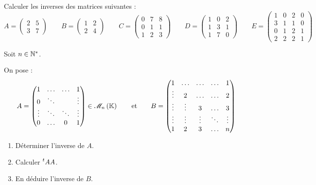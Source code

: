 \begin{corr}
\end{corr}

\begin{exo}
Calculer les inverses des matrices suivantes : \[A=\begin{pmatrix}
2 & 5 \\
3 & 7
\end{pmatrix}\qquad B=\begin{pmatrix}
1 & 2 \\
2 & 4
\end{pmatrix}\qquad C=\begin{pmatrix}
0 & 7 & 8 \\
0 & 1 & 1 \\
1 & 2 & 3
\end{pmatrix}\qquad D=\begin{pmatrix}
1 & 0 & 2 \\
1 & 3 & 1 \\
1 & 7 & 0
\end{pmatrix}\qquad E=\begin{pmatrix}
1 & 0 & 2 & 0 \\
3 & 1 & 1 & 0 \\
0 & 1 & 2 & 1 \\
2 & 2 & 2 & 1
\end{pmatrix}\]
\end{exo}

\begin{corr}
\end{corr}

\begin{exo}
Soit \(n\in\mathbb{N}^*\).

On pose : \[A=\begin{pmatrix}
1 & \dots & \dots & 1 \\
0 & \ddots &  & \vdots \\
\vdots & \ddots & \ddots & \vdots \\
0 & \dots & 0 & 1
\end{pmatrix}\in\M{n}\qquad\text{et}\qquad B=\begin{pmatrix}
1 & \dots & \dots & \dots & 1 \\
\vdots & 2 & \dots & \dots & 2 \\
\vdots & \vdots & 3 & \dots & 3 \\
\vdots & \vdots & \vdots & \ddots & \vdots \\
1 & 2 & 3 & \dots & n
\end{pmatrix}\]

\begin{enumerate}
\item Déterminer l'inverse de \(A\). \\

\item Calculer \(\prescript{t}{}{A}A\). \\

\item En déduire l'inverse de \(B\).
\end{enumerate}
\end{exo}

